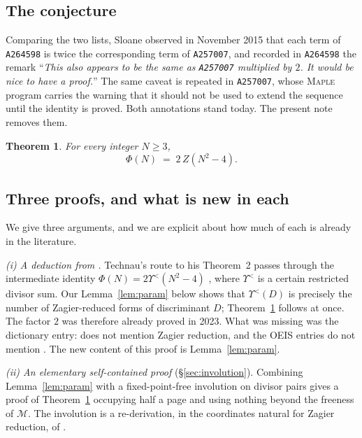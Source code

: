 \documentclass[11pt,reqno]{amsart}
\theoremstyle{plain}
\newtheorem{theorem}{Theorem}[section]
\theoremstyle{definition}
\newcommand{\Mon}{\mathcal{M}}
\begin{document}
\subsection{The conjecture}
Comparing the two lists, Sloane observed in November 2015 that each term of
\texttt{A264598} is twice the corresponding term of \texttt{A257007}, and recorded in
\texttt{A264598} the remark ``\emph{This also appears to be the same as \texttt{A257007}
multiplied by $2$. It would be nice to have a proof.}'' The same caveat is repeated in
\texttt{A257007}, whose \textsc{Maple} program carries the warning that it should not be
used to extend the sequence until the identity is proved. Both annotations stand today.
The present note removes them.

\begin{theorem}\label{thm:main}
For every integer $N\ge 3$,
\[
  \Phi(N)\;=\;2\,Z(N^2-4).
\]
\end{theorem}

\subsection{Three proofs, and what is new in each}
We give three arguments, and we are explicit about how much of each is already in the
literature.

\emph{(i) A deduction from \cite{Technau}.} Technau's route to his Theorem~2 passes
through the intermediate identity $\Phi(N)=2\Upsilon^{<}(N^2-4)$ \cite[(3.2)]{Technau},
where $\Upsilon^{<}$ is a certain restricted divisor sum. Our Lemma~\ref{lem:param}
below shows that $\Upsilon^{<}(D)$ is precisely the number of Zagier-reduced forms of
discriminant $D$; Theorem~\ref{thm:main} follows at once. The factor $2$ was therefore
already proved in 2023. What was missing was the dictionary entry: \cite{Technau} does
not mention Zagier reduction, and the OEIS entries do not mention \cite{Technau}. The
new content of this proof is Lemma~\ref{lem:param}.

\emph{(ii) An elementary self-contained proof} (\S\ref{sec:involution}). Combining
Lemma~\ref{lem:param} with a fixed-point-free involution on divisor pairs gives a proof
of Theorem~\ref{thm:main} occupying half a page and using nothing beyond the freeness of
$\Mon$. The involution is a re-derivation, in the coordinates natural for Zagier
reduction, of \cite[Lemma~4]{Technau}.
\end{document}
